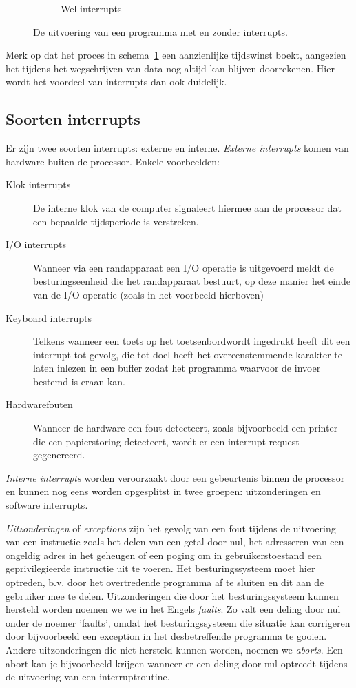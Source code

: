 \begin{figure}
\begin{subfigure}{.5\textwidth}
  \caption{Wel interrupts}
  \label{fig:progflowwithint}
\end{subfigure}
\caption{De uitvoering van een programma met en zonder interrupts.}
\label{fig:intsandnoints}
\end{figure}

Merk op dat het proces in schema~\ref{fig:progflowwithint} een aanzienlijke tijdswinst boekt, aangezien het tijdens het wegschrijven van data nog altijd kan blijven doorrekenen. Hier wordt het voordeel van interrupts dan ook duidelijk.

\subsection{Soorten interrupts}

Er zijn twee soorten interrupts: externe en interne.
\emph{Externe interrupts} komen van hardware buiten de
processor. Enkele voorbeelden:

\begin{description}
\item[Klok interrupts] De interne klok van de computer signaleert hiermee aan de
processor dat een bepaalde tijdsperiode is verstreken.
\item[I/O interrupts] Wanneer via een randapparaat een I/O operatie is
uitgevoerd meldt de besturingseenheid die het randapparaat
bestuurt, op deze manier het einde van de I/O operatie (zoals in het voorbeeld
hierboven)
\item[Keyboard interrupts] Telkens wanneer een toets op het toetsenbordwordt
ingedrukt heeft dit een interrupt tot gevolg, die tot doel heeft het
overeenstemmende karakter te laten inlezen in een buffer zodat het programma
waarvoor de invoer bestemd is eraan
kan.
\item[Hardwarefouten] Wanneer de hardware een fout detecteert, zoals bijvoorbeeld
 een printer die een papierstoring detecteert, wordt er een interrupt request gegenereerd.
\end{description}

\emph{Interne interrupts} worden veroorzaakt
door een gebeurtenis binnen de processor en kunnen nog eens worden
opgesplitst in twee groepen: uitzonderingen en software
interrupts.

\emph{Uitzonderingen} of \emph{exceptions} zijn het gevolg van een fout tijdens
de uitvoering van een instructie zoals het delen van een getal door
nul, het adresseren van een ongeldig adres in het geheugen of een
poging om in gebruikerstoestand een geprivilegieerde instructie uit te
voeren. Het besturingssysteem moet hier optreden, b.v. door het
overtredende programma af te sluiten en dit aan de gebruiker mee te
delen. Uitzonderingen die door het besturingssysteem kunnen hersteld worden noemen we we in
het Engels \emph{faults}. Zo valt een deling door nul onder de noemer 'faults', omdat het besturingssysteem die situatie kan corrigeren door bijvoorbeeld een exception in het desbetreffende programma te gooien. Andere uitzonderingen die niet hersteld kunnen worden, noemen we \emph{aborts}. Een abort kan je bijvoorbeeld krijgen wanneer er een deling door nul optreedt tijdens de uitvoering van een interruptroutine.

